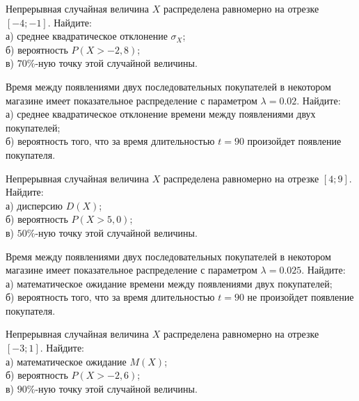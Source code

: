\vfill

\newpage\setcounter{zad}{0}

\z Непрерывная случайная величина $X$ распределена равномерно на отрезке $[-4; -1]$. Найдите: \\ \quad а) среднее квадратическое отклонение $\sigma_X$; \\ \quad б) вероятность $P(X>-2{,}8)$; \\ \quad в) $70\%$-ную точку этой случайной величины.


\vfill

\z Время между появлениями двух последовательных покупателей в некотором магазине имеет показательное распределение с параметром $\lambda = 0.02$. Найдите: \\ \quad а) среднее квадратическое отклонение времени между появлениями двух покупателей; \\ \quad б) вероятность того, что за время длительностью $t = 90$  произойдет появление покупателя.
 

\vfill

\newpage\setcounter{zad}{0}

\z Непрерывная случайная величина $X$ распределена равномерно на отрезке $[4; 9]$. Найдите: \\ \quad а) дисперсию $D(X)$; \\ \quad б) вероятность $P(X>5{,}0)$; \\ \quad в) $50\%$-ную точку этой случайной величины.


\vfill

\z Время между появлениями двух последовательных покупателей в некотором магазине имеет показательное распределение с параметром $\lambda = 0.025$. Найдите: \\ \quad а) математическое ожидание времени между появлениями двух покупателей; \\ \quad б) вероятность того, что за время длительностью $t = 90$ не произойдет появление покупателя.
 

\vfill

\newpage\setcounter{zad}{0}

\z Непрерывная случайная величина $X$ распределена равномерно на отрезке $[-3; 1]$. Найдите: \\ \quad а) математическое ожидание $M(X)$; \\ \quad б) вероятность $P(X>-2{,}6)$; \\ \quad в) $90\%$-ную точку этой случайной величины.


\vfill

